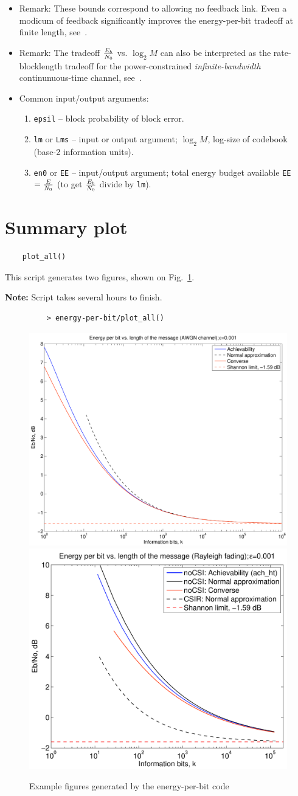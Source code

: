 \documentclass[a4paper,11p]{memoir}
\begin{document}
\begin{itemize}
\item Remark: These bounds correspond to allowing no feedback link. Even a modicum of feedback significantly
improves the energy-per-bit tradeoff at finite length, see~\cite{PPV10eneff}.

\item Remark: The tradeoff $E_b\over N_0$ vs. $\log_2 M$ can also be interpreted as the rate-blocklength tradeoff for the
power-constrained \textit{infinite-bandwidth} continunuous-time channel, see~\cite[(50)-(51)]{PPV10eneff}.

\item Common input/output arguments:
\begin{enumerate}
\item \verb|epsil| -- block probability of block error.
\item \verb|lm| or \verb|Lms| -- input or output argument; $\log_2 M$, log-size of codebook (base-2 information units). 
\item \verb|en0| or \verb|EE| -- input/output argument; total energy budget available \verb|EE|$={E\over N_0}$ (to get ${E_b\over
N_0}$ divide by \verb|lm|).
\end{enumerate}
\end{itemize}

\section{Summary plot}

\begin{verbatim}
	plot_all()
\end{verbatim}

This script generates two figures, shown on Fig.~\ref{fig:ebno_example}.

\textbf{Note:} Script takes several hours to finish.

\begin{figure}
\centering
\begin{verbatim}
	> energy-per-bit/plot_all()
\end{verbatim}

\includegraphics[width=.4\textwidth]{plots/energy_awgn}
\includegraphics[width=.4\textwidth]{plots/energy_nocsi}
\caption{Example figures generated by the energy-per-bit code}\label{fig:ebno_example}
\end{figure}
\end{document}
